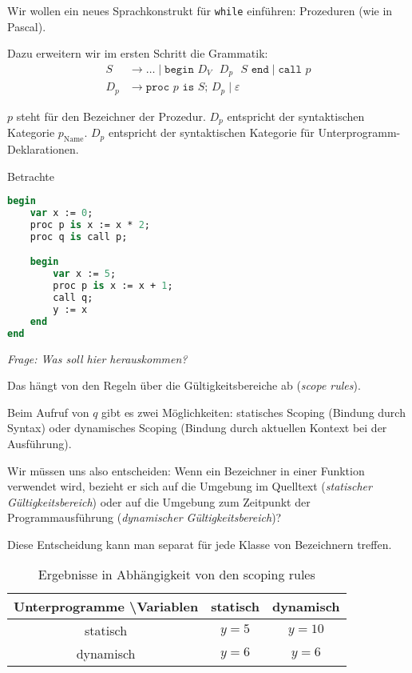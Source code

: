 \begin{lemma}[Determiniertheit]
Wir wollen ein neues Sprachkonstrukt für \texttt{while} einführen: Prozeduren (wie in Pascal).

Dazu erweitern wir im ersten Schritt die Grammatik:
\begin{align*}
    S & \to \dots \;\vert\; \texttt{begin $D_V$ $D_p$ $S$ end} \;\vert\; \texttt{call $p$} \\
    D_p & \to \texttt{proc $p$ is $S$; $D_p$} \;\vert\; \varepsilon
\end{align*}

$p$ steht für den Bezeichner der Prozedur. $D_p$ entspricht der syntaktischen Kategorie $p_{\text{Name}}$.
$D_p$ entspricht der syntaktischen Kategorie für Unterprogramm-Deklarationen.

\par\medskip
\begin{example}
Betrachte
\begin{lstlisting}[language=Pascal, caption=Programm mit Unterprogrammen]
begin
    var x := 0;
    proc p is x := x * 2;
    proc q is call p;

    begin
        var x := 5;
        proc p is x := x + 1;
        call q;
        y := x
    end
end
\end{lstlisting}

\emph{Frage: Was soll hier herauskommen?}

Das hängt von den Regeln über die Gültigkeitsbereiche ab (\emph{scope rules}).

Beim Aufruf von $q$ gibt es zwei Möglichkeiten: statisches Scoping (Bindung durch Syntax) oder dynamisches Scoping (Bindung durch aktuellen Kontext bei der Ausführung).

Wir müssen uns also entscheiden: Wenn ein Bezeichner in einer Funktion verwendet wird, bezieht er sich auf die Umgebung im Quelltext (\emph{statischer Gültigkeitsbereich}) oder auf die Umgebung zum Zeitpunkt der Programmausführung (\emph{dynamischer Gültigkeitsbereich})?

Diese Entscheidung kann man separat für jede Klasse von Bezeichnern treffen.
\end{example}

\begin{table}[H]
    \centering
    \begin{tabular}{c||c|c}
        Unterprogramme \textbackslash Variablen & statisch & dynamisch \\ \hline \hline
        statisch  & $y = 5$ & $y = 10$ \\ \hline
        dynamisch & $y = 6$ & $y = 6$
    \end{tabular}
    \caption{Ergebnisse in Abhängigkeit von den scoping rules}
\end{table}




\end{lemma}
